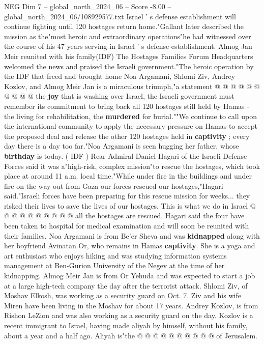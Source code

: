 \begin{textsample}{NEG Dim 7 – global\_north\_2024\_06 – Score -8.00 – global\_north\_2024\_06/108929577.txt}
Israel ' s defense establishment will continue fighting until 120 hostages return home."Gallant later described the mission as the"most heroic and extraordinary operations"he had witnessed over the course of his 47 years serving in Israel ' s defense establishment.
Almog Jan Meir reunited with his family(IDF) The Hostages Families Forum Headquarters welcomed the news and praised the Israeli government."The heroic operation by the IDF that freed and brought home Noa Argamani, Shlomi Ziv, Andrey Kozlov, and Almog Meir Jan is a miraculous triumph,"a statement @ @ @ @ @ @ @ @ @ @ the \textbf{joy} that is washing over Israel, the Israeli government must remember its commitment to bring back all 120 hostages still held by Hamas - the living for rehabilitation, the \textbf{murdered} for burial.""We continue to call upon the international community to apply the necessary pressure on Hamas to accept the proposed deal and release the other 120 hostages held in \textbf{captivity} ; every day there is a day too far."Noa Argamani is seen hugging her father, whose \textbf{birthday} is today. ( IDF ) Rear Admiral Daniel Hagari of the Israeli Defense Forces said it was a"high-risk, complex mission"to rescue the hostages, which took place at around 11 a.m. local time."While under fire in the buildings and under fire on the way out from Gaza our forces rescued our hostages,"Hagari said."Israeli forces have been preparing for this rescue mission for weeks... they risked their lives to save the lives of our hostages.
This is what we do in Israel @ @ @ @ @ @ @ @ @ @ all the hostages are rescued.
Hagari said the four have been taken to hospital for medical examination and will soon be reunited with their families.
Noa Argamani is from Be'er Sheva and was \textbf{kidnapped} along with her boyfriend Avinatan Or, who remains in Hamas \textbf{captivity}.
She is a yoga and art enthusiast who enjoys hiking and was studying information systems management at Ben-Gurion University of the Negev at the time of her kidnapping.
Almog Meir Jan is from Or Yehuda and was expected to start a job at a large high-tech company the day after the terrorist attack.
Shlomi Ziv, of Moshav Elkosh, was working as a security guard on Oct. 7.
Ziv and his wife Miren have been living in the Moshav for about 17 years.
Andrey Kozlov, is from Rishon LeZion and was also working as a security guard on the day.
Kozlov is a recent immigrant to Israel, having made aliyah by himself, without his family, about a year and a half ago.
Aliyah is"the @ @ @ @ @ @ @ @ @ @ of Jerusalem.

\end{textsample}
